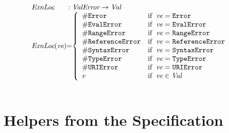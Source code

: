 \[\begin{array}{l@{}c@{}l}
\hf{ExnLoc} & :& \ValError \rightarrow \Val \\
\hf{ExnLoc}(\emph{ve}) &=&
\left\{ \begin{array}{ll}
{\tt \#Error} &\ifc{\emph{ve} = {\tt Error}}\\
{\tt \#EvalError} &\ifc{\emph{ve} = {\tt EvalError}}\\
{\tt \#RangeError} &\ifc{\emph{ve} = {\tt RangeError}}\\
{\tt \#ReferenceError} &\ifc{\emph{ve} = {\tt ReferenceError}}\\
{\tt \#SyntaxError} &\ifc{\emph{ve} = {\tt SyntaxError}}\\
{\tt \#TypeError} &\ifc{\emph{ve} = {\tt TypeError}}\\
{\tt \#URIError} &\ifc{\emph{ve} = {\tt URIError}}\\
v&\ifc{\emph{ve} \in \Val}\\
\end{array}
\right.
\\\\
\end{array}
\]


\section{Helpers from the Specification}
